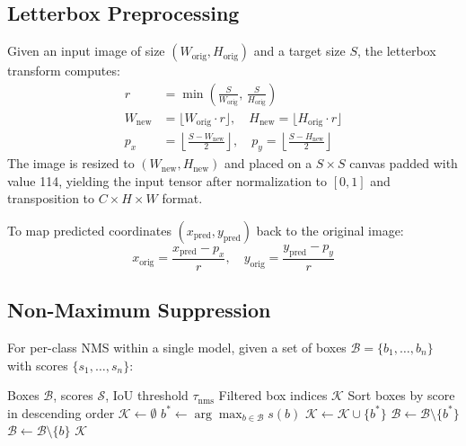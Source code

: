 \documentclass[11pt,a4paper]{article}
\begin{document}
\subsection{Letterbox Preprocessing}

Given an input image of size $(W_{\text{orig}}, H_{\text{orig}})$ and a target size $S$, the letterbox transform computes:
\begin{align}
    r &= \min\!\left(\frac{S}{W_{\text{orig}}},\, \frac{S}{H_{\text{orig}}}\right) \label{eq:scale}\\[4pt]
    W_{\text{new}} &= \lfloor W_{\text{orig}} \cdot r \rfloor, \quad H_{\text{new}} = \lfloor H_{\text{orig}} \cdot r \rfloor \\[4pt]
    p_x &= \left\lfloor \frac{S - W_{\text{new}}}{2} \right\rfloor, \quad p_y = \left\lfloor \frac{S - H_{\text{new}}}{2} \right\rfloor
\end{align}
The image is resized to $(W_{\text{new}}, H_{\text{new}})$ and placed on a $S \times S$ canvas padded with value 114, yielding the input tensor after normalization to $[0,1]$ and transposition to $C \times H \times W$ format.

To map predicted coordinates $(x_{\text{pred}}, y_{\text{pred}})$ back to the original image:
\begin{equation}
    x_{\text{orig}} = \frac{x_{\text{pred}} - p_x}{r}, \quad y_{\text{orig}} = \frac{y_{\text{pred}} - p_y}{r}
    \label{eq:unpad}
\end{equation}

\subsection{Non-Maximum Suppression}

For per-class NMS within a single model, given a set of boxes $\mathcal{B} = \{b_1, \ldots, b_n\}$ with scores $\{s_1, \ldots, s_n\}$:

\begin{algorithm}[H]
\caption{Greedy Non-Maximum Suppression}
\label{alg:nms}
\begin{algorithmic}[1]
\Require Boxes $\mathcal{B}$, scores $\mathcal{S}$, IoU threshold $\tau_{\text{nms}}$
\Ensure Filtered box indices $\mathcal{K}$
\State Sort boxes by score in descending order
\State $\mathcal{K} \gets \emptyset$
    \State $b^* \gets \arg\max_{b \in \mathcal{B}} s(b)$
    \State $\mathcal{K} \gets \mathcal{K} \cup \{b^*\}$
    \State $\mathcal{B} \gets \mathcal{B} \setminus \{b^*\}$
            \State $\mathcal{B} \gets \mathcal{B} \setminus \{b\}$
        \EndIf
    \EndFor
\EndWhile
\State \Return $\mathcal{K}$
\end{algorithmic}
\end{algorithm}
\end{document}
